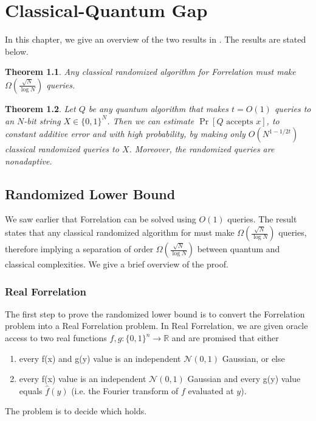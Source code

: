 \documentclass[12pt]{report}
\newtheorem{theorem}{Theorem}
\begin{document}
\chapter{Classical-Quantum Gap}
In this chapter, we give an overview of the two results in \cite{paper1}. The results are stated below.

\begin{theorem}
Any classical randomized algorithm for Forrelation must make $\Omega(\frac{\sqrt{N}}{\log N})$ queries.
\end{theorem}

\begin{theorem}
Let $Q$ be any quantum algorithm that makes $t = O(1)$ queries to an $N$-bit string $X \in \{0,1\}^{N}$. Then we can estimate $\Pr[Q\text{ accepts }x]$, to constant additive error and with high probability, by making only $O(N^{1 - 1/2t})$ classical randomized queries to $X$. Moreover, the randomized queries are nonadaptive.
\end{theorem}

\section{Randomized Lower Bound}
We saw earlier that Forrelation can be solved using $O(1)$ queries. The result states that any classical randomized algorithm for must make $\Omega(\frac{\sqrt{N}}{\log N})$ queries, therefore implying a separation of order $\Omega(\frac{\sqrt{N}}{\log N})$ between quantum and classical complexities. We give a brief overview of the proof.

\subsection{Real Forrelation}
The first step to prove the randomized lower bound is to convert the Forrelation problem into a Real Forrelation problem. In Real Forrelation, we are given oracle access to two real functions $f,g\colon \{0,1\}^{n}\rightarrow \mathbb{R}$ and are promised that either
\begin{enumerate}
\item every f(x) and g(y) value is an independent $\mathcal{N}(0,1)$ Gaussian, or else
\item every f(x) value is an independent $\mathcal{N}(0,1)$ Gaussian and every g(y) value equals $\hat{f}(y)$ (i.e. the Fourier transform of $f$ evaluated at $y$).
\end{enumerate}
The problem is to decide which holds.
\end{document}
